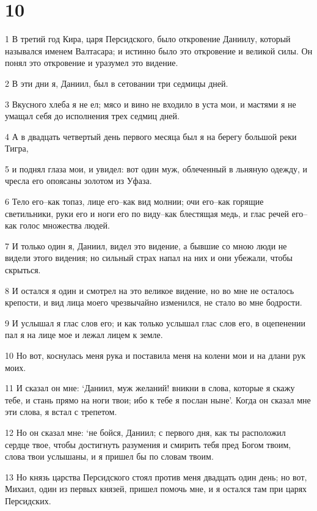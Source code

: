 \chapter{10}

\par 1 В третий год Кира, царя Персидского, было откровение Даниилу, который назывался именем Валтасара; и истинно было это откровение и великой силы. Он понял это откровение и уразумел это видение.
\par 2 В эти дни я, Даниил, был в сетовании три седмицы дней.
\par 3 Вкусного хлеба я не ел; мясо и вино не входило в уста мои, и мастями я не умащал себя до исполнения трех седмиц дней.
\par 4 А в двадцать четвертый день первого месяца был я на берегу большой реки Тигра,
\par 5 и поднял глаза мои, и увидел: вот один муж, облеченный в льняную одежду, и чресла его опоясаны золотом из Уфаза.
\par 6 Тело его--как топаз, лице его--как вид молнии; очи его--как горящие светильники, руки его и ноги его по виду--как блестящая медь, и глас речей его--как голос множества людей.
\par 7 И только один я, Даниил, видел это видение, а бывшие со мною люди не видели этого видения; но сильный страх напал на них и они убежали, чтобы скрыться.
\par 8 И остался я один и смотрел на это великое видение, но во мне не осталось крепости, и вид лица моего чрезвычайно изменился, не стало во мне бодрости.
\par 9 И услышал я глас слов его; и как только услышал глас слов его, в оцепенении пал я на лице мое и лежал лицем к земле.
\par 10 Но вот, коснулась меня рука и поставила меня на колени мои и на длани рук моих.
\par 11 И сказал он мне: `Даниил, муж желаний! вникни в слова, которые я скажу тебе, и стань прямо на ноги твои; ибо к тебе я послан ныне'. Когда он сказал мне эти слова, я встал с трепетом.
\par 12 Но он сказал мне: `не бойся, Даниил; с первого дня, как ты расположил сердце твое, чтобы достигнуть разумения и смирить тебя пред Богом твоим, слова твои услышаны, и я пришел бы по словам твоим.
\par 13 Но князь царства Персидского стоял против меня двадцать один день; но вот, Михаил, один из первых князей, пришел помочь мне, и я остался там при царях Персидских.
